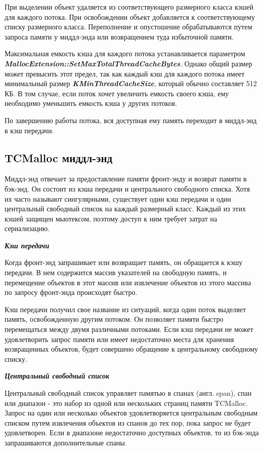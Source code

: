 При выделении объект удаляется из соответствующего размерного класса кэшей для каждого потока. При освобождении объект добавляется к соответствующему списку размерного класса. Переполнение и опустошение обрабатываются путем запроса памяти у миддл-энда или возвращением туда избыточной памяти.

Максимальная емкость кэша для каждого потока устанавливается параметром \textbf{\textit{MallocExtension::SetMaxTotalThreadCacheBytes}}. Однако общий размер может превысить этот предел, так как каждый кэш для каждого потока имеет минимальный размер \textbf{\textit{KMinThreadCacheSize}}, который обычно составляет 512 КБ. В том случае, если поток хочет увеличить емкость своего кэша, ему необходимо уменьшить емкость кэша у других потоков.

По завершению работы потока, вся доступная ему память переходит в миддл-энд в кэш передачи.

\subsection{TCMalloc миддл-энд}
Миддл-энд отвечает за предоставление памяти фронт-энду и возврат памяти в бэк-энд. Он состоит из кэша передачи и центрального свободного списка. Хотя их часто называют сингулярными, существует один кэш передачи и один центральный свободный список на каждый размерный класс. Каждый из этих кэшей защищен мьютексом, поэтому доступ к ним требует затрат на сериализацию.

\bigbreak
\textit{\textbf{Кэш передачи}}

Когда фронт-энд запрашивает или возвращает память, он обращается к кэшу передачи. В нем содержится массив указателей на свободную память, и перемещение объектов в этот массив или извлечение объектов из этого массива по запросу фронт-энда происходят быстро.

Кэш передачи получил свое название из ситуаций, когда один поток выделяет память, освобожденную другим потоком. Он позволяет памяти быстро перемещаться между двумя различными потоками. Если кэш передачи не может удовлетворить запрос памяти или имеет недостаточно места для хранения возвращенных объектов, будет совершено обращение к центральному свободному списку.

\bigbreak
\textit{\textbf{Центральный свободный список}}

Центральный свободный список управляет памятью в спанах (англ. span), спан или диапазон - это набор из одной или нескольких страниц памяти TCMalloc. Запрос на один или несколько объектов удовлетворяется центральным свободным списком путем извлечения объектов из спанов до тех пор, пока запрос не будет удовлетворен. Если в диапазоне недостаточно доступных объектов, то из бэк-энда запрашиваются дополнительные спаны.


